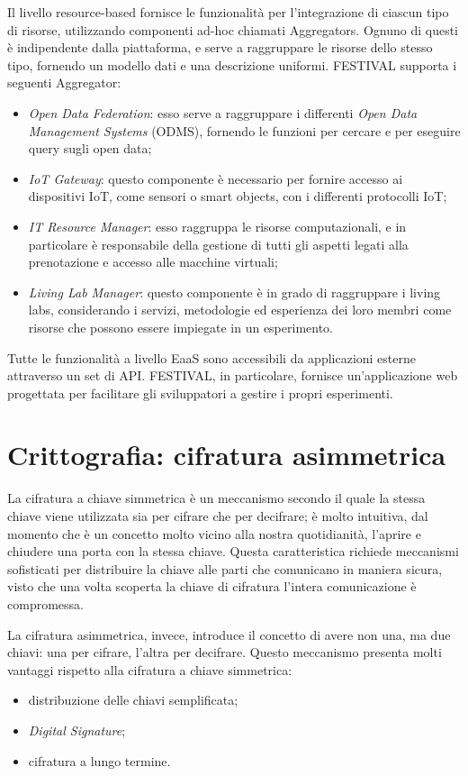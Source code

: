 Il livello resource-based fornisce le funzionalità per l'integrazione di ciascun tipo di risorse, utilizzando componenti ad-hoc chiamati Aggregators. Ognuno di questi è indipendente dalla piattaforma, e serve a raggruppare le risorse dello stesso tipo, fornendo un modello dati e una descrizione uniformi. FESTIVAL supporta i seguenti Aggregator:
\begin{itemize}
    \item \textit{Open Data Federation}: esso serve a raggruppare i differenti \textit{Open Data Management Systems} (ODMS), fornendo le funzioni per cercare e per eseguire query sugli open data;
    \item \textit{IoT Gateway}: questo componente è necessario per fornire accesso ai dispositivi IoT, come sensori o smart objects, con i differenti protocolli IoT;
    \item \textit{IT Resource Manager}: esso raggruppa le risorse computazionali, e in particolare è responsabile della gestione di tutti gli aspetti legati alla prenotazione e accesso alle macchine virtuali;
    \item \textit{Living Lab Manager}: questo componente è in grado di raggruppare i living labs, considerando i servizi, metodologie ed esperienza dei loro membri come risorse che possono essere impiegate in un esperimento.  
\end{itemize}

Tutte le funzionalità a livello EaaS sono accessibili da applicazioni esterne attraverso un set di API. FESTIVAL, in particolare, fornisce un'applicazione web progettata per facilitare gli sviluppatori a gestire i propri esperimenti.


\section{Crittografia: cifratura asimmetrica}
\label{c:tec:cifratura}

La cifratura a chiave simmetrica è un meccanismo secondo il quale la stessa chiave viene utilizzata sia per cifrare che per decifrare; è molto intuitiva, dal momento che è un concetto molto vicino alla nostra quotidianità, l'aprire e chiudere una porta con la stessa chiave.
Questa caratteristica richiede meccanismi sofisticati per distribuire la chiave alle parti che comunicano in maniera sicura, visto che una volta scoperta la chiave di cifratura l'intera comunicazione è compromessa.

La cifratura asimmetrica, invece, introduce il concetto di avere non una, ma due chiavi: una per cifrare, l'altra per decifrare\cite{Cgi2004}. Questo meccanismo presenta molti vantaggi rispetto alla cifratura a chiave simmetrica:
\begin{itemize}
    \item distribuzione delle chiavi semplificata;
    \item \textit{Digital Signature};
    \item cifratura a lungo termine.
\end{itemize}

